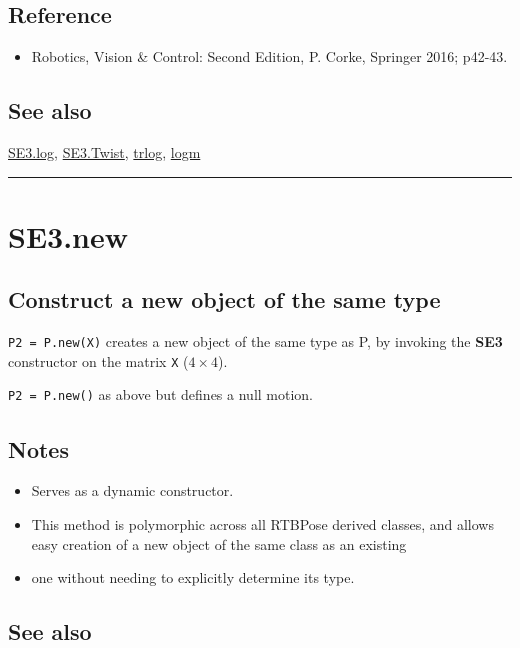 \subsection*{Reference}
\begin{itemize}
  \item Robotics, Vision \& Control: Second Edition, P. Corke, Springer 2016; p42-43.
\end{itemize}

\subsection*{See also}


\hyperlink{SE3.log}{\color{blue} SE3.log}, \hyperlink{SE3.Twist}{\color{blue} SE3.Twist}, \hyperlink{trlog}{\color{blue} trlog}, \hyperlink{logm}{\color{blue} logm}

\vspace{1.5ex}\hrule

\hypertarget{SE3.new}{\section*{SE3.new}}
\subsection*{Construct a new object of the same type}


\texttt{P2 = P.new(X)} creates a new object of the same type as P, by invoking the \textbf{\color{red} SE3} constructor on the matrix
\texttt{X} ($4 \times 4$).



\texttt{P2 = P.new()} as above but defines a null motion.


\subsection*{Notes}
\begin{itemize}
  \item Serves as a dynamic constructor.
  \item This method is polymorphic across all RTBPose derived classes, and     allows easy creation of a new object of the same class as an existing
  \item one without needing to explicitly determine its type.
\end{itemize}

\subsection*{See also}


